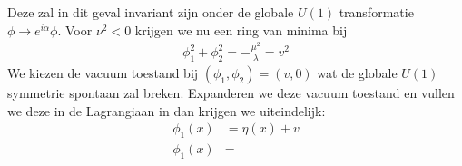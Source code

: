 \documentclass[../main.tex]{subfiles}
\begin{document}
Deze zal in dit geval invariant zijn onder de globale $U(1)$ transformatie $\phi \rightarrow e^{i\alpha}\phi$. Voor $\nu^2<0$ krijgen we nu een ring van minima bij
\begin{equation}
    \begin{aligned}
        \label{eq:complex_symm_breking}
        \phi_1^2+\phi_2^2 = -\frac{\mu^2}{\lambda} =v^2
    \end{aligned}
\end{equation}
We kiezen de vacuum toestand bij $(\phi_1, \phi_2) = (v,0)$ wat de globale $U(1)$ symmetrie spontaan zal breken. Expanderen we deze vacuum toestand en vullen we deze in de Lagrangiaan in dan krijgen we uiteindelijk:
\begin{equation}
    \begin{aligned}
        \label{eq:comple_scalair_veld_symm_breking}
        \phi_1(x) &= \eta(x) + v\\
        \phi_1(x) &=
    \end{aligned}
\end{equation}
\end{document}
